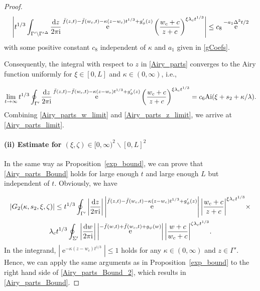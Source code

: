 \documentclass[cmp]{svjour}
\numberwithin{theorem}{section}
\numberwithin{equation}{section}
\DeclareMathOperator{\e}{e}
\def\dd{{\rm d}}
\def\ii{{\rm i}}
\begin{document}
\begin{proof}
\begin{equation*}
\label{Airy_parts_z_2}
\left| t^{1/3} \int_{\Gamma' \backslash {\Gamma'}^\Delta } \frac{\dd z}{2 \pi \ii} \e^{\bar{f}(z,t)-\bar{f}(w_c,t) - \kappa (z - w_c) t^{1/3} + g'_{\phi}(z)}  {\left( \frac{w_c + c}{z + c} \right)}^{\xi \lambda_c t^{1/3}} \right| \leq c_8 \e^{- a_1 \Delta^3 t/2 }
\end{equation*}
with some positive constant $c_8$ independent of $\kappa$ and $a_1$ given in \eqref{gCoefs}.

Consequently, the integral with respect to $z$ in \eqref{Airy_parts} converges to the Airy function uniformly for $\xi \in [0,L]$ and $\kappa \in (0, \infty)$, i.e.,

\begin{equation}
\label{Airy_parts_z_limit}
\lim_{t \to \infty} t^{1/3} \oint_{\Gamma'} \frac{\dd z}{2 \pi \ii} \e^{\bar{f}(z,t)-\bar{f}(w_c,t) - \kappa (z - w_c) t^{1/3} + g'_{\phi}(z)}  {\left( \frac{w_c + c}{z + c} \right)}^{\xi \lambda_c t^{1/3}} = c_6 \mathrm{Ai}(\xi + s_2 + \kappa / \lambda).
\end{equation}
Combining \eqref{Airy_parts_w_limit} and \eqref{Airy_parts_z_limit}, we arrive at
\eqref{Airy_parts_limit}.

\paragraph{(ii) Estimate for $(\xi , \zeta) \in [0, \infty )^2 \backslash [0,L]^2$}

In the same way as Proposition~\ref{exp_bound}, we can prove that \eqref{Airy_parts_Bound} holds for large enough $t$ and large enough $L$ but independent of $t$.
Obviously, we have

\begin{multline}
\label{Airy_parts_Bound_2}
\left| G_2(\kappa, s_2, \xi , \zeta) \right| \leq t^{1/3} \oint_{\Gamma'} \left| \frac{\dd z}{2 \pi \ii} \right| \left| \e^{\bar{f}(z,t)-\bar{f}(w_c,t) - \kappa (z - w_c) t^{1/3} + g'_{\phi}(z)} \right| {\left| \frac{w_c + c}{z + c} \right|}^{\xi \lambda_c t^{1/3}} \times  \\   
\lambda_c t^{1/3} \oint_{\Sigma'} \left| \frac{\dd w}{2 \pi \ii} \right| \left| \e^{-\bar{f}(w,t) + \bar{f}(w_c,t) + g_{\psi}(w)} \right| {\left| \frac{w+c}{w_c + c} \right|}^{\zeta \lambda_c t^{1/3}}.
\end{multline}
In the integrand, $|\e^{- \kappa (z - w_c) t^{1/3}}| \leq 1$ holds for any $\kappa \in (0, \infty)$ and $z \in \Gamma'$. Hence, we can apply the same arguments as in Proposition~\ref{exp_bound} to the right hand side of \eqref{Airy_parts_Bound_2}, which results in \eqref{Airy_parts_Bound}.



\end{proof}
\end{document}
